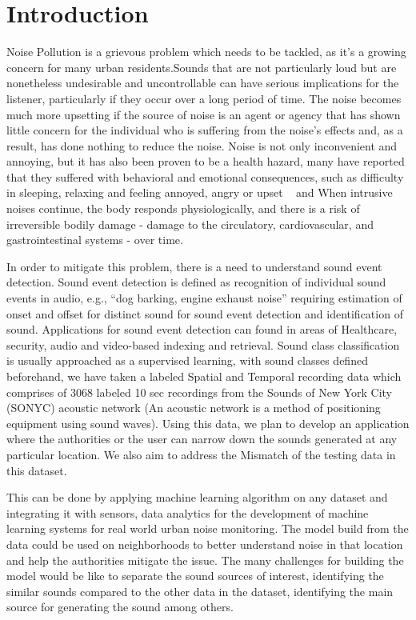 \section{Introduction}
Noise Pollution is a grievous problem which needs to be tackled, as it’s a growing concern for many urban residents.Sounds that are not particularly loud but are nonetheless undesirable and uncontrollable can have serious implications for the listener, particularly if they occur over a long period of time. The noise becomes much more upsetting if the source of noise is an agent or agency that has shown little concern for the individual who is suffering from the noise's effects and, as a result, has done nothing to reduce the noise. Noise is not only inconvenient and annoying, but it has also been proven to be a health hazard, many have reported that they suffered with behavioral and emotional consequences, such as difficulty in sleeping, relaxing and feeling annoyed, angry or upset ~\cite{1,2,3} and When intrusive noises continue, the body responds physiologically, and there is a risk of irreversible bodily damage - damage to the circulatory, cardiovascular, and gastrointestinal systems - over time.


 In order to mitigate this problem, there is a need to understand sound event detection. Sound event detection is defined as recognition of individual sound events in audio, e.g., “dog barking, engine exhaust noise” requiring estimation of onset and offset for distinct sound for sound event detection and identification of sound. Applications for sound event detection can found in areas of Healthcare, security, audio and video-based indexing and retrieval. Sound class classification is usually approached as a supervised learning, with sound classes defined beforehand, we have taken a labeled Spatial and Temporal recording data which comprises of 3068 labeled 10 sec recordings from the Sounds of New York City (SONYC) acoustic network (An acoustic network is a method of positioning equipment using sound waves). Using this data, we plan to develop an application where the authorities or the user can narrow down the sounds generated at any particular location. We also aim to address the Mismatch of the testing data in this dataset.

This can be done by applying machine learning algorithm on any dataset and integrating it with sensors, data analytics for the development of machine learning systems for real world urban noise monitoring. The model build from the data could be used on neighborhoods to better understand noise in that location and help the authorities mitigate the issue. The many challenges for building the model would be like to separate the sound sources of interest, identifying the similar sounds compared to the other data in the dataset, identifying the main source for generating the sound among others.   
         
